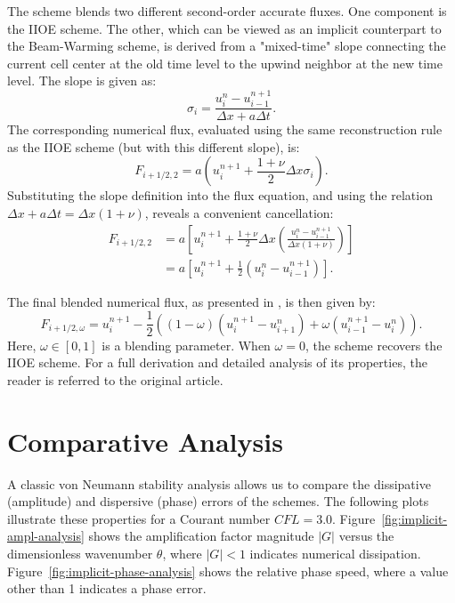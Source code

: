 The scheme blends two different second-order accurate fluxes. One component is the IIOE scheme. The other, which can be viewed as an implicit counterpart to the Beam-Warming scheme, is derived from a "mixed-time" slope connecting the current cell center at the old time level to the upwind neighbor at the new time level. The slope is given as:
\[
    \sigma_i = \frac{u_i^n - u_{i-1}^{n+1}}{\Delta x + a\Delta t}.
\]
The corresponding numerical flux, evaluated using the same reconstruction rule as the IIOE scheme (but with this different slope), is:
\[
    F_{i+1/2, 2} = a \left( u_i^{n+1} + \frac{1+\nu}{2}\Delta x \sigma_i \right).
\]
Substituting the slope definition into the flux equation, and using the relation \(\Delta x + a\Delta t = \Delta x(1+\nu)\), reveals a convenient cancellation:
\begin{equation}
    \begin{split}
        F_{i+1/2, 2} &= a \left[ u_i^{n+1} + \frac{1+\nu}{2}\Delta x \left( \frac{u_i^n - u_{i-1}^{n+1}}{\Delta x (1 + \nu)} \right) \right] \\
                  &= a \left[ u_i^{n+1} + \frac{1}{2} \left( u_i^n - u_{i-1}^{n+1} \right) \right].
    \end{split}
\end{equation}

The final blended numerical flux, as presented in \cite{frolkovic2023high}, is then given by:
\begin{equation}
    F_{i+1/2, \omega} = u_{i}^{n+1} - \frac{1}{2}\left( (1-\omega)(u_{i}^{n+1} - u_{i+1}^{n}) + \omega(u_{i-1}^{n+1} - u_{i}^{n})
\right).
\end{equation}
Here, \(\omega \in [0, 1]\) is a blending parameter. When \(\omega=0\), the scheme recovers the IIOE scheme. For a full derivation and detailed analysis of its properties, the reader is referred to the original article.


\section{Comparative Analysis}

A classic von Neumann stability analysis allows us to compare the dissipative (amplitude) and dispersive (phase) errors of the schemes.
The following plots illustrate these properties for a Courant number \(CFL=3.0\).
Figure~\ref{fig:implicit-ampl-analysis} shows the amplification factor magnitude \(|G|\) versus the dimensionless wavenumber \(\theta\), where \(|G|<1\) indicates numerical dissipation.
Figure~\ref{fig:implicit-phase-analysis} shows the relative phase speed, where a value other than 1 indicates a phase error.

